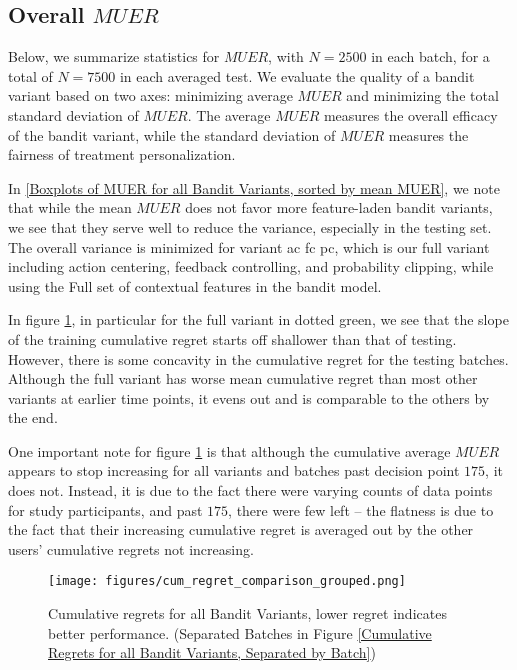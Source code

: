 \subsection{Overall $MUER$}

Below, we summarize statistics for $MUER$, with $N = 2500$ in each batch, for a total of $N = 7500$ in each averaged test.  We evaluate the quality of a bandit variant based on two axes: minimizing average $MUER$ and minimizing the total standard deviation of $MUER$.  The average $MUER$ measures the overall efficacy of the bandit variant, while the standard deviation of $MUER$ measures the fairness of treatment personalization.

In \ref{Boxplots of MUER for all Bandit Variants, sorted by mean MUER}, we note that while the mean $MUER$ does not favor more feature-laden bandit variants, we see that they serve well to reduce the variance, especially in the testing set.  The overall variance is minimized for variant ac fc pc, which is our full variant including action centering, feedback controlling, and probability clipping, while using the Full set of contextual features in the bandit model.


In figure \ref{Cumulative Regrets for all Bandit Variants}, in particular for the full variant in dotted green, we see that the slope of the training cumulative regret starts off shallower than that of testing.  However, there is some concavity in the cumulative regret for the testing batches. Although the full variant has worse mean cumulative regret than most other variants at earlier time points, it evens out and is comparable to the others by the end.

One important note for figure \ref{Cumulative Regrets for all Bandit Variants} is that although the cumulative average $MUER$ appears to stop increasing for all variants and batches past decision point $175$, it does not.  Instead, it is due to the fact there were varying counts of data points for study participants, and past $175$, there were few left -- the flatness is due to the fact that their increasing cumulative regret is averaged out by the other users' cumulative regrets not increasing.

\begin{figure}[h!]
\texttt{[image: figures/cum\_regret\_comparison\_grouped.png]}%
\caption{Cumulative regrets for all Bandit Variants, lower regret indicates better performance. (Separated Batches in Figure \ref{Cumulative Regrets for all Bandit Variants, Separated by Batch})}
\label{Cumulative Regrets for all Bandit Variants}
\end{figure}


